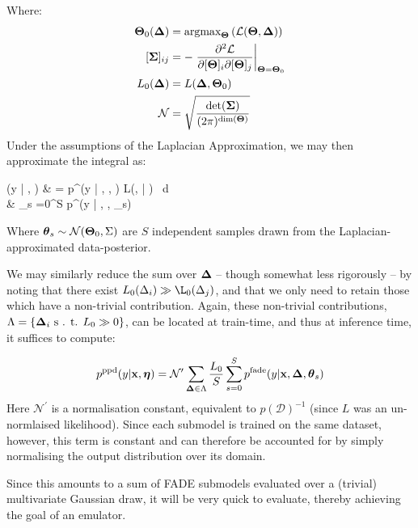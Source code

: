 	Where:
	\begin{align}
		\vT_0(\vD)          & = \text{argmax}_\vT \left( \mathcal{L}(\vT, \vD) \right)
		\\
		[\vec{\Sigma}]_{ij} & = - \left.\pdiv{^2\mathcal{L}}{[\vT]_i \partial [\vT]_j}\right|_{\vT = \vT_0}
		\\
		L_0(\vD)            & = L(\vD, \vT_0)
		\\
		\mathcal{N}         & = \sqrt{\frac{\text{det}(\vec{\Sigma})}{(2\pi)^{\text{dim}(\vT)} }}
	\end{align}
	Under the assumptions of the Laplacian Approximation, we may then approximate the integral as:
	\begin{spalign}
		(y | , \vD) & = \int p^(y | , \vec{\Delta}, \vT) \times L(\vT, \vec{\Delta} | )~ \mathrm d \vT
		\\
		& \approx {} \sum_{s =0}^S p^(y | \x, \vD, \vec{\theta}_s)
	\end{spalign}
	Where $\mathbf{\boldsymbol{\mathrm{\theta}}}_s \sim \mathcal{N}(\mathbf{\boldsymbol{\mathrm{\Theta}}}_0, \Sigma)$ are $S$ independent samples drawn from the Laplacian-approximated data-posterior.

	We may similarly reduce the sum over $\mathbf{\boldsymbol{\mathrm{\Delta}}}$ -- though somewhat less rigorously -- by noting that there exist $L_0(\Delta_i) \gg \L_0(\Delta_j)$, and that we only need to retain those which have a non-trivial contribution. Again, these non-trivial contributions, $\Lambda = \{ \mathbf{\boldsymbol{\mathrm{\Delta}}}_i \text{ s . t. } L_0 \gg 0 \}$, can be located at train-time, and thus at inference time, it suffices to compute:

	\begin{equation}
		p^\text{ppd}(y | \mathbf{\boldsymbol{\mathrm{x}}} , \mathbf{\boldsymbol{\mathrm{\eta}}}) = \mathcal{N}^\prime\sum_{\mathbf{\boldsymbol{\mathrm{\Delta}}} \in \Lambda} \frac{L_0}{S}\sum_{s = 0}^S  p^\text{fade}(y | \mathbf{\boldsymbol{\mathrm{x}}}, \mathbf{\boldsymbol{\mathrm{\Delta}}}, \mathbf{\boldsymbol{\mathrm{\theta}}}_s)
	\end{equation}
	Here $\mathcal{N}^\prime$ is a normalisation constant, equivalent to $p(\mathcal{D})^{-1}$ (since $L$ was an un-normlaised likelihood). Since each submodel is trained on the same dataset, however, this term is constant and can therefore be accounted for by simply normalising the output distribution over its domain.

	Since this amounts to a sum of FADE submodels evaluated over a (trivial)  multivariate Gaussian draw, it will be very quick to evaluate, thereby achieving the goal of an emulator.
